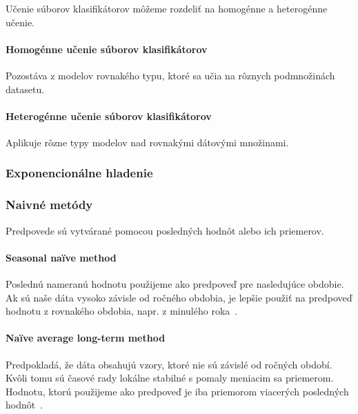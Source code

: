 \documentclass[a4paper,slovak,12pt,appendix]{article}
\begin{document}
Učenie súborov klasifikátorov môžeme rozdeliť na homogénne a heterogénne učenie.

\paragraph{Homogénne učenie súborov klasifikátorov}
Pozostáva z modelov rovnakého typu, ktoré sa učia na rôznych podmnožinách
datasetu.
\paragraph{Heterogénne učenie súborov klasifikátorov}
Aplikuje rôzne typy modelov nad rovnakými dátovými množinami\cite{Grmanova2016}.


\subsubsection{Exponencionálne hladenie}


\subsubsection{Naivné metódy}
Predpovede sú vytvárané pomocou posledných hodnôt alebo ich priemerov.

\paragraph{Seasonal naïve method}
Poslednú nameranú hodnotu použijeme ako predpoveď pre nasledujúce obdobie. Ak
sú naše dáta vysoko závisle od ročného obdobia, je lepšie použiť na predpoveď
hodnotu z rovnakého obdobia, napr. z minulého roka~\cite{Grmanova2016}.

\paragraph{Naïve average long-term method}
Predpokladá, že dáta obsahujú vzory, ktoré nie sú závislé od ročných období.
Kvôli tomu sú časové rady lokálne stabilné s pomaly meniacim sa priemerom.
Hodnotu, ktorú použijeme ako predpoveď je iba priemorom viacerých posledných
hodnôt~\cite{Grmanova2016}.
\end{document}
